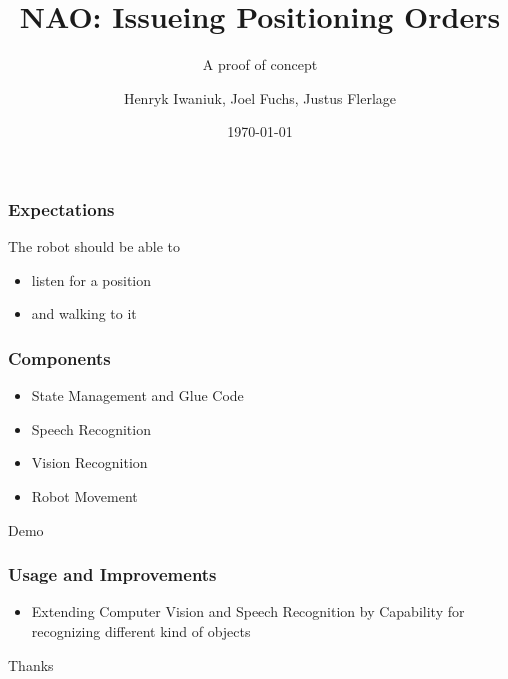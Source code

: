 \documentclass{beamer}
\title{NAO: Issueing Positioning Orders}
\subtitle{A proof of concept}
\author{Henryk Iwaniuk, Joel Fuchs, Justus Flerlage}
\date{\today}
\institute{https://github.com/Teszko/nao\_project}
\begin{document}
\maketitle

\begin{frame}
  \frametitle{Expectations}
  \pause
  The robot should be able to
  \pause
  \begin{itemize}
  \item listen for a position 
    \pause
  \item and walking to it
  \end{itemize}
\end{frame}

\begin{frame}
  \frametitle{Components}
  \pause
  \begin{itemize}
  \item State Management and Glue Code
    \pause
  \item Speech Recognition
    \pause
  \item Vision Recognition
    \pause
  \item Robot Movement
  \end{itemize}
\end{frame}

\begin{frame}[c]
  \begin{center}
    \Huge Demo
  \end{center}
\end{frame}

\begin{frame}
  \frametitle{Usage and Improvements}
  \begin{itemize}
    \item Extending Computer Vision and Speech Recognition by Capability for
      recognizing different kind of objects
  \end{itemize}
\end{frame}

\begin{frame}[c]
  \begin{center}
    \Huge Thanks 
  \end{center}
\end{frame}
\end{document}
